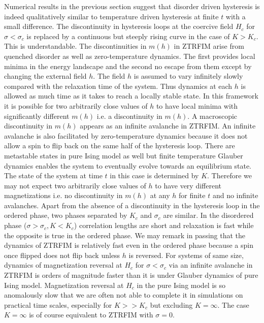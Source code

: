 \documentclass[a4,aps,amsmath,floatfix,nofootinbib,10pt]{revtex4}
\begin{document}
Numerical results in the previous section suggest that disorder driven 
hysteresis is indeed qualitatively similar to temperature driven 
hysteresis at finite $t$ with a small difference. The discontinuity in 
hysteresis loops at the coercive field $H_c$ for $\sigma < \sigma_c$ is 
replaced by a continuous but steeply rising curve in the case of $K > 
K_c$. This is understandable. The discontinuities in $m(h)$ in ZTRFIM 
arise from quenched disorder as well as zero-temperature dynamics. The 
first provides local minima in the energy landscape and the second no 
escape from them except by changing the external field $h$. The field 
$h$ is assumed to vary infinitely slowly compared with the relaxation 
time of the system. Thus dynamics at each $h$ is allowed as much time 
as it takes to reach a locally stable state. In this framework it is 
possible for two arbitrarily close values of $h$ to have local minima 
with significantly different $m(h)$ i.e. a discontinuity in $m(h)$. A 
macroscopic discontinuity in $m(h)$ appears as an infinite avalanche in 
ZTRFIM. An infinite avalanche is also facilitated by zero-temperature 
dynamics because it does not allow a spin to flip back on the same half 
of the hysteresis loop. There are metastable states in pure Ising model 
as well but finite temperature Glauber dynamics enables the system to 
eventually evolve towards an equilibrium state. The state of the system 
at time $t$ in this case is determined by $K$. Therefore we may not 
expect two arbitrarily close values of $h$ to have very different 
magnetizations i.e. no discontinuity in $m(h)$ at any $h$ for finite 
$t$ and no infinite avalanches. Apart from the absence of a 
discontinuity in the hysteresis loop in the ordered phase, two phases 
separated by $K_c$ and $\sigma_c$ are similar. In the disordered phase 
($\sigma > \sigma_c, K < K_c$) correlation lengths are short and 
relaxation is fast while the opposite is true in the ordered phase. We 
may remark in passing that the dynamics of ZTRFIM is relatively fast 
even in the ordered phase because a spin once flipped does not flip 
back unless $h$ is reversed. For systems of same size, dynamics of 
magnetization reversal at $H_c$ for $\sigma < \sigma_c$ via an infinite 
avalanche in ZTRFIM is orders of magnitude faster than it is under 
Glauber dynamics of pure Ising model. Magnetization reversal at $H_c$ 
in the pure Ising model is so anomalously slow that we are often not 
able to complete it in simulations on practical time scales, especially 
for $K >> K_c$ but excluding $K=\infty$. The case $K=\infty$ is of 
course equivalent to ZTRFIM with $\sigma=0$.
\end{document}
